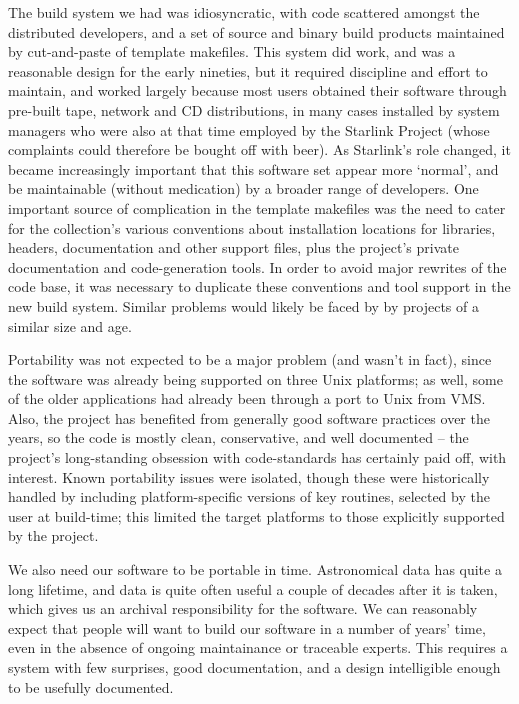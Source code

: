 \documentclass{speauth}
\begin{document}
The build system we had was idiosyncratic, with code scattered amongst
the distributed developers, and a set of source and binary build
products maintained by cut-and-paste of template makefiles.  This
system did work, and was a reasonable design for the early nineties,
but it required discipline and effort to maintain, and worked largely
because most users obtained their software through pre-built tape, network and
CD distributions, in many cases installed by system managers who were
also at that time employed by the Starlink Project (whose complaints
could therefore be bought off with beer).  As Starlink's
role changed, it became increasingly important that this software set
appear more `normal', and be maintainable (without medication) by a
broader range of developers.  One important source of complication in the
template makefiles was the need to cater for the collection's various
conventions about installation locations for libraries, headers,
documentation and other support files, plus the project's private
documentation and code-generation tools.  In order to avoid major
rewrites of the code base, it was necessary to duplicate these
conventions and tool support in the new build system.  Similar
problems would likely be faced by by projects of a similar size and age.

Portability was not expected to be a major problem (and wasn't in
fact), since the software was already being supported on three Unix
platforms; as well, some of the older applications had already been
through a port to Unix from VMS.  Also, the project has benefited from
generally good software practices over the years, so the code is
mostly clean, conservative, and well documented -- the project's
long-standing obsession with code-standards has certainly paid off,
with interest.  Known portability issues were isolated, though these
were historically handled by including platform-specific versions of
key routines, selected by the user at build-time; this limited the
target platforms to those explicitly supported by the project.


We also need our software to be portable in time.  Astronomical data
has quite a long lifetime, and data is quite often useful a couple of
decades after it is taken, which gives us an archival
responsibility for the software.  We can reasonably expect that people
will want to build our software in a number of years' time, even in
the absence of ongoing maintainance or traceable experts.  This
requires a system with few surprises, good documentation, and a design
intelligible enough to be usefully documented.
\end{document}
